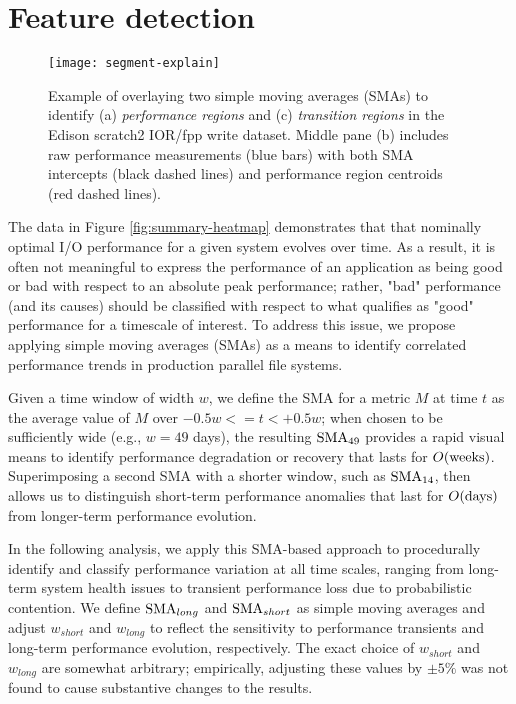 \section{Feature detection}  \label{sec:features}

\begin{figure}[t]
    \centering
    \texttt{[image: segment-explain]}
    \vspace{-.35in}
    \caption{Example of overlaying two simple moving averages (SMAs) to identify (a) \emph{performance regions} and (c) \emph{transition regions} in the Edison scratch2 IOR/fpp write dataset.  Middle pane (b) includes raw performance measurements (blue bars) with both SMA intercepts (black dashed lines) and performance region centroids (red dashed lines).}
    \label{fig:segment-explain}
\end{figure}

The data in Figure \ref{fig:summary-heatmap} demonstrates that that nominally optimal I/O performance for a given system evolves over time.
As a result, it is often not meaningful to express the performance of an application as being good or bad with respect to an absolute peak performance;
rather, "bad" performance (and its causes) should be classified with respect to what qualifies as "good" performance for a timescale of interest.
To address this issue, we propose applying simple moving averages (SMAs) as a means to identify correlated performance trends in production parallel file systems.

Given a time window of width $w$, we define the SMA for a metric $M$ at time $t$ as the average value of $M$ over ${-0.5w <= t < +0.5w}$;
when chosen to be sufficiently wide (e.g., $w = 49$ days), the resulting $\textup{SMA}_{49}$ provides a rapid visual means to identify performance degradation or recovery that lasts for $O(\textup{weeks})$.  Superimposing a second SMA with a shorter window, such as $\textup{SMA}_{14}$, then allows us to distinguish short-term performance anomalies that last for $O(\textup{days})$ from longer-term performance evolution.

In the following analysis, we apply this SMA-based approach to procedurally identify and classify performance variation at all time scales, ranging from long-term system health issues to transient performance loss due to probabilistic contention.
We define $\textup{SMA}_{long}$ and $\textup{SMA}_{short}$ as simple moving averages and adjust $w_{short}$ and $w_{long}$ to reflect the sensitivity to performance transients and long-term performance evolution, respectively.
The exact choice of $w_{short}$ and $w_{long}$ are somewhat arbitrary; empirically, adjusting these values by $\pm 5 \%$ was not found to cause substantive changes to the results.

